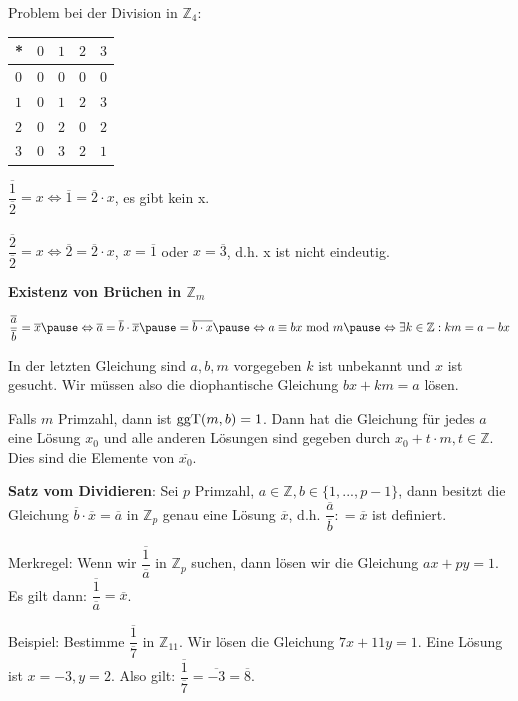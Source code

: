 \begin{frame}[fragile]
Problem bei der Division in $\mathbb{Z}_4:$ 

\begin{tabular}{lllll}
* & $0$ & $1$ & $2$ & $3$ \\ \hline
$0$ & $0$ & $0$ & $0$ & $0$ \\
$1$ & $0$ & $1$ & $2$ & $3$ \\
$2$ & $0$ & $2$ & $0$ & $2$ \\
$3$ & $0$ & $3$ & $2$ & $1$ \\
\end{tabular}

$ \dfrac{\overline{1}}{\overline{2}} = x \Leftrightarrow \overline{1} = \overline{2} \cdot x$\pause, \quad es gibt kein x. 
\\~\\
$ \dfrac{\overline{2}}{\overline{2}} = x \Leftrightarrow \overline{2} = \overline{2} \cdot x$\pause, \quad $x=\overline{1}$ oder $x=\overline{3}$, d.h. x ist nicht eindeutig.

\end{frame}

\begin{frame}[fragile]
\textbf{Existenz von Brüchen in $\mathbb{Z}_m$ } \pause

$ \dfrac{\overline{a}}{\overline{b}} = \overline{x} \pause \Leftrightarrow \overline{a} = \overline{b} \cdot \overline{x} \pause = \overline{b \cdot x} \pause
 \Leftrightarrow \Mod{a}{bx}{m}  \pause \Leftrightarrow \exists k \in \mathbb{Z}: km = a-bx$  \pause
 
 In der letzten Gleichung sind $a, b, m$ vorgegeben $k$ ist unbekannt und $x$ ist gesucht. \pause Wir müssen also die diophantische Gleichung  $bx+km=a$ lösen. \pause
 
 Falls $m$ Primzahl, dann ist $\operatorname{ggT}(m,b) = 1$. \pause Dann hat die Gleichung für jedes $a$ eine Lösung $x_0$ \pause und alle anderen Lösungen sind gegeben
 durch $x_0 + t\cdot m, t \in \mathbb{Z}$. \pause Dies sind die Elemente von $\overline{x_0}$.

\end{frame}

\begin{frame}[fragile]
\textbf{Satz vom Dividieren}: Sei $p$ Primzahl, $a \in \mathbb{Z}, b \in \{1,...,p-1\}$, dann besitzt die Gleichung 
$\overline{b} \cdot \overline{x} = \overline{a}$ in  $\mathbb{Z}_p$ genau eine Lösung $\overline{x}$, \pause  d.h.   $\dfrac{\overline{a}}{\overline{b}}: = \overline{x}$ ist definiert. \pause

Merkregel: Wenn wir $ \dfrac{\overline{1}}{\overline{a}}$ in $\mathbb{Z}_p$ suchen, dann lösen wir die Gleichung $ax + py = 1$. Es gilt dann:
$\dfrac{\overline{1}}{\overline{a}} = \overline{x}$. \pause

Beispiel: Bestimme $ \dfrac{\overline{1}}{\overline{7}}$ in $\mathbb{Z}_{11}$. \pause Wir lösen die Gleichung $7x + 11y = 1$.
\pause Eine Lösung ist $x=-3, y=2$. \pause Also gilt: $\dfrac{\overline{1}}{\overline{7}} = \overline{-3} = \overline{8}$.
\end{frame}

